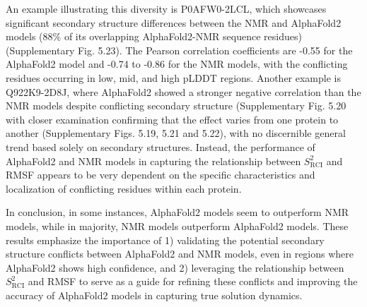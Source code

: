 
An example illustrating this diversity is P0AFW0-2LCL, which showcases significant secondary structure differences between the NMR and AlphaFold2 models (88\% of its overlapping AlphaFold2-NMR sequence residues) (Supplementary Fig. 5.23).
The Pearson correlation coefficients are -0.55 for the AlphaFold2 model and -0.74 to -0.86 for the NMR models, with the conflicting residues occurring in low, mid, and high pLDDT regions. 
Another example is Q922K9-2D8J, where AlphaFold2 showed a stronger negative correlation than the NMR models despite conflicting secondary structure (Supplementary Fig. 5.20
with closer examination confirming that the effect varies from one protein to another (Supplementary Figs. 5.19, 5.21 and 5.22),
with no discernible general trend based solely on secondary structures. 
%
Instead, the performance of AlphaFold2 and NMR models in capturing the relationship between \(S^{2}_{\text{RCI}}\) and RMSF appears to be very dependent on the specific characteristics and localization of conflicting residues within each protein. 

In conclusion, in some instances, AlphaFold2 models seem to outperform NMR models, while in majority, NMR models outperform AlphaFold2 models. These results emphasize the importance of 1) validating the potential secondary structure conflicts between AlphaFold2 and NMR models, even in regions where AlphaFold2 shows high confidence, and 2) leveraging the relationship between \(S^{2}_{\text{RCI}}\) and RMSF to serve as a guide for refining these conflicts and improving the accuracy of AlphaFold2 models in capturing true solution dynamics.

